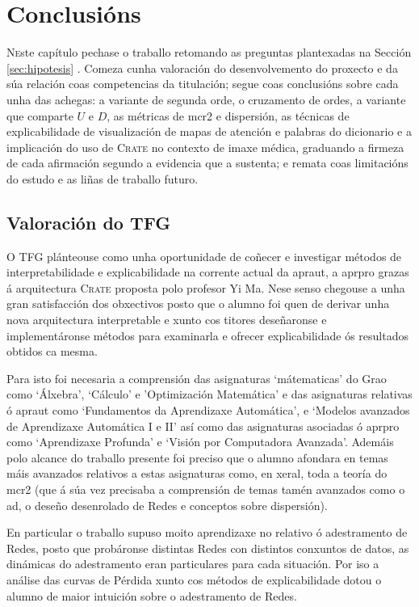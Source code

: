 \chapter{Conclusións}
\label{chap:conclusions}

\lettrine{N}este capítulo pechase o traballo retomando as preguntas plantexadas na Sección \ref{sec:hipotesis} . Comeza cunha valoración do desenvolvemento do proxecto e da súa relación coas competencias da titulación; segue coas conclusións sobre cada unha das achegas: a variante de segunda orde, o cruzamento de ordes, a variante que comparte $U$ e $D$, as métricas de \acrshort{mcr2} e dispersión, as técnicas de explicabilidade de visualización de mapas de atención e palabras do dicionario e a implicación do uso de \textsc{Crate} no contexto de imaxe médica, graduando a firmeza de cada afirmación segundo a evidencia que a sustenta; e remata coas limitacións do estudo e as liñas de traballo futuro.

\section{Valoración do TFG}

O TFG plánteouse como unha oportunidade de coñecer e investigar métodos de \gls{interpretabilidade} e \gls{explicabilidade} na corrente actual da \acrshort{apraut}, a \acrshort{aprpro} grazas á arquitectura \textsc{Crate} proposta polo profesor Yi Ma. Nese senso chegouse a unha gran satisfacción dos obxectivos posto que o alumno foi quen de derivar unha nova arquitectura interpretable e xunto cos titores deseñaronse e implementáronse métodos para examinarla e ofrecer \gls{explicabilidade} ós resultados obtidos ca mesma.

Para isto foi necesaria a comprensión das asignaturas `mátematicas' do Grao como `Álxebra', `Cálculo' e 'Optimización Matemática' e das asignaturas relativas ó \acrshort{apraut} como `Fundamentos da Aprendizaxe Automática', e `Modelos avanzados de Aprendizaxe Automática I e II' así como das asignaturas asociadas ó \acrshort{aprpro} como `Aprendizaxe Profunda' e `Visión por Computadora Avanzada'. Ademáis polo alcance do traballo presente foi preciso que o alumno afondara en temas máis avanzados relativos a estas asignaturas como, en xeral, toda a teoría do \acrshort{mcr2} (que á súa vez precisaba a comprensión de temas tamén avanzados como o \acrshort{ad}, o deseño desenrolado de Redes e conceptos sobre dispersión).

En particular o traballo supuso moito aprendizaxe no relativo ó adestramento de Redes, posto que probáronse distintas Redes con distintos conxuntos de datos, as dinámicas do adestramento eran particulares para cada situación. Por iso a análise das curvas de Pérdida xunto cos métodos de \gls{explicabilidade} dotou o alumno de maior intuición sobre o adestramento de Redes.


